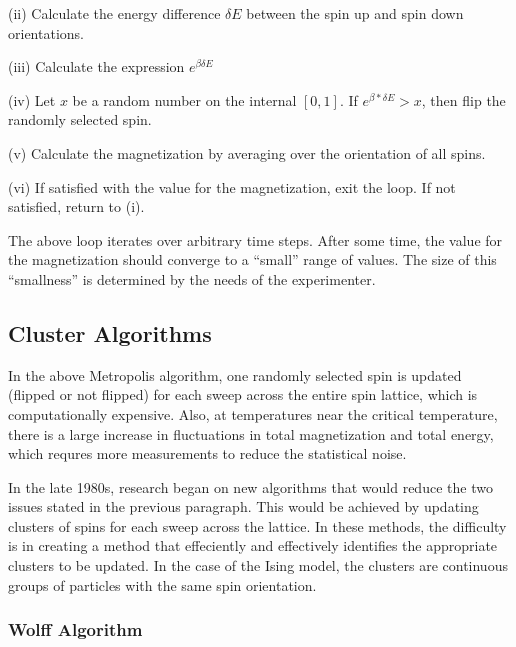 \documentclass[11pt,letterpaper,fleqn]{article}
\begin{document}
(ii) Calculate the energy difference $\delta E$ between the spin up and spin down orientations.
\newline

(iii) Calculate the expression $e^{\beta \delta E}$
\newline

(iv) Let $x$ be a random number on the internal $[0,1]$.  If $e^{\beta * \delta E} > x$, then flip 
the randomly selected spin.
\newline

(v) Calculate the magnetization by averaging over the orientation of all spins.
\newline

(vi) If satisfied with the value for the magnetization, exit the loop.  If not satisfied, return to (i).
\newline


The above loop iterates over arbitrary time steps.  After some time, the value for the magnetization should converge to a ``small'' 
range of values.  The size of this ``smallness'' is determined by the needs of the experimenter.


\subsection*{Cluster Algorithms}


In the above Metropolis algorithm, one randomly selected spin is updated (flipped or not flipped) for each sweep across the 
entire spin lattice, which is computationally expensive. Also, at temperatures near the critical temperature, there is a large
increase in fluctuations in total magnetization and total energy, which requres more measurements to reduce the statistical noise.


In the late 1980s, research began on new algorithms that would reduce the two issues stated in the previous paragraph.
This would be achieved by updating clusters of spins for each sweep across the lattice.  
In these methods, the difficulty is in creating a method that effeciently and effectively
identifies the appropriate clusters to be updated.  In the case of the Ising model, the clusters are continuous groups
of particles with the same spin orientation.


\subsubsection*{Wolff Algorithm}
\end{document}
